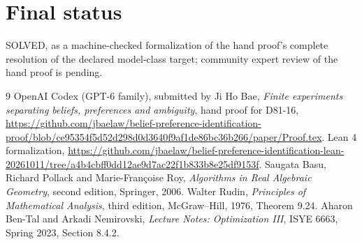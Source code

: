 \documentclass[11pt]{article}
\begin{document}
\section*{Final status}
SOLVED, as a machine-checked formalization of the hand proof's complete resolution of the declared model-class target; community expert review of the hand proof is pending.

\begin{thebibliography}{9}
 OpenAI Codex (GPT-6 family), submitted by Ji Ho Bae, \emph{Finite experiments separating beliefs, preferences and ambiguity}, hand proof for D81-16, \url{https://github.com/jbaelaw/belief-preference-identification-proof/blob/ce95354f5d52d298d0d3640f9af1de86bc36b266/paper/Proof.tex}.
 Lean 4 formalization, \url{https://github.com/jbaelaw/belief-preference-identification-lean-20261011/tree/a4b4cbff0dd12ae9d7ac22f1b833b8e25df9153f}.
 Saugata Basu, Richard Pollack and Marie-Fran\c{c}oise Roy, \emph{Algorithms in Real Algebraic Geometry}, second edition, Springer, 2006.
 Walter Rudin, \emph{Principles of Mathematical Analysis}, third edition, McGraw--Hill, 1976, Theorem 9.24.
 Aharon Ben-Tal and Arkadi Nemirovski, \emph{Lecture Notes: Optimization III}, ISYE 6663, Spring 2023, Section 8.4.2.
\end{thebibliography}
\end{document}

